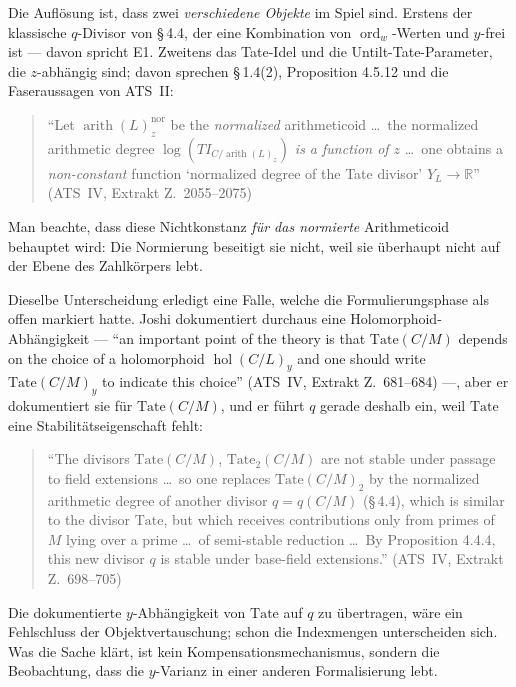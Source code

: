 \documentclass[11pt,a4paper]{article}
\theoremstyle{definition}
\theoremstyle{plain}
\theoremstyle{definition}
\newcommand{\arith}{\operatorname{arith}}
\newcommand{\hol}{\operatorname{hol}}
\newcommand{\ordd}{\operatorname{ord}}
\newcommand{\Ynum}{Y_L}
\newcommand{\anchor}[2]{(#1, Extrakt Z.~#2)}
\begin{document}
Die Auflösung ist, dass zwei \emph{verschiedene Objekte} im Spiel sind. Erstens der
klassische $q$-Divisor von \S\,4.4, der eine Kombination von $\ordd_w$-Werten und
$y$-frei ist --- davon spricht E1. Zweitens das Tate-Idel und die
Untilt-Tate-Parameter, die $z$-abhängig sind; davon sprechen \S\,1.4(2),
Proposition 4.5.12 und die Faseraussagen von ATS~II:

\begin{quote}\small
``Let $\arith(L)^{\mathrm{nor}}_z$ be the \emph{normalized} arithmeticoid \ldots\
the normalized arithmetic degree $\log(TI_{C/\arith(L)_z})$ \emph{is a function of
$z$} \ldots\ one obtains a \emph{non-constant} function `normalized degree of the
Tate divisor' $\Ynum \to \mathbb{R}$'' \hfill\anchor{ATS~IV}{2055--2075}
\end{quote}

Man beachte, dass diese Nichtkonstanz \emph{für das normierte} Arithmeticoid
behauptet wird: Die Normierung beseitigt sie nicht, weil sie überhaupt nicht auf der
Ebene des Zahlkörpers lebt.

Dieselbe Unterscheidung erledigt eine Falle, welche die Formulierungsphase als offen
markiert hatte. Joshi dokumentiert durchaus eine Holomorphoid-Abhängigkeit --- ``an
important point of the theory is that $\mathrm{Tate}(C/M)$ depends on the choice of
a holomorphoid $\hol(C/L)_y$ and one should write $\mathrm{Tate}(C/M)_y$ to indicate
this choice'' \anchor{ATS~IV}{681--684} ---, aber er dokumentiert sie für
$\mathrm{Tate}(C/M)$, und er führt $q$ gerade deshalb ein, weil $\mathrm{Tate}$ eine
Stabilitätseigenschaft fehlt:

\begin{quote}\small
``The divisors $\mathrm{Tate}(C/M)$, $\mathrm{Tate}_2(C/M)$ are not stable under
passage to field extensions \ldots\ so one replaces $\mathrm{Tate}(C/M)_2$ by the
normalized arithmetic degree of another divisor $q = q(C/M)$ (\S\,4.4), which is
similar to the divisor $\mathrm{Tate}$, but which receives contributions only from
primes of $M$ lying over a prime \ldots\ of semi-stable reduction \ldots\ By
Proposition 4.4.4, this new divisor $q$ is stable under base-field extensions.''
\hfill\anchor{ATS~IV}{698--705}
\end{quote}

Die dokumentierte $y$-Abhängigkeit von $\mathrm{Tate}$ auf $q$ zu übertragen, wäre
ein Fehlschluss der Objektvertauschung; schon die Indexmengen unterscheiden sich.
Was die Sache klärt, ist kein Kompensationsmechanismus, sondern die Beobachtung,
dass die $y$-Varianz in einer anderen Formalisierung lebt.
\end{document}
